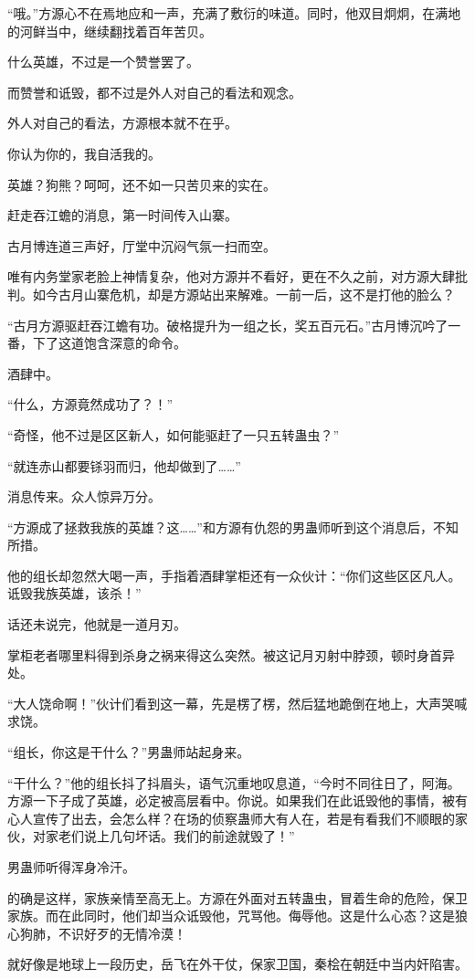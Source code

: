 \begin{this_body}
“哦。”方源心不在焉地应和一声，充满了敷衍的味道。同时，他双目炯炯，在满地的河鲜当中，继续翻找着百年苦贝。

什么英雄，不过是一个赞誉罢了。

而赞誉和诋毁，都不过是外人对自己的看法和观念。

外人对自己的看法，方源根本就不在乎。

你认为你的，我自活我的。

英雄？狗熊？呵呵，还不如一只苦贝来的实在。

赶走吞江蟾的消息，第一时间传入山寨。

古月博连道三声好，厅堂中沉闷气氛一扫而空。

唯有内务堂家老脸上神情复杂，他对方源并不看好，更在不久之前，对方源大肆批判。如今古月山寨危机，却是方源站出来解难。一前一后，这不是打他的脸么？

“古月方源驱赶吞江蟾有功。破格提升为一组之长，奖五百元石。”古月博沉吟了一番，下了这道饱含深意的命令。

酒肆中。

“什么，方源竟然成功了？！”

“奇怪，他不过是区区新人，如何能驱赶了一只五转蛊虫？”

“就连赤山都要铩羽而归，他却做到了……”

消息传来。众人惊异万分。

“方源成了拯救我族的英雄？这……”和方源有仇怨的男蛊师听到这个消息后，不知所措。

他的组长却忽然大喝一声，手指着酒肆掌柜还有一众伙计：“你们这些区区凡人。诋毁我族英雄，该杀！”

话还未说完，他就是一道月刃。

掌柜老者哪里料得到杀身之祸来得这么突然。被这记月刃射中脖颈，顿时身首异处。

“大人饶命啊！”伙计们看到这一幕，先是楞了楞，然后猛地跪倒在地上，大声哭喊求饶。

“组长，你这是干什么？”男蛊师站起身来。

“干什么？”他的组长抖了抖眉头，语气沉重地叹息道，“今时不同往日了，阿海。方源一下子成了英雄，必定被高层看中。你说。如果我们在此诋毁他的事情，被有心人宣传了出去，会怎么样？在场的侦察蛊师大有人在，若是有看我们不顺眼的家伙，对家老们说上几句坏话。我们的前途就毁了！”

男蛊师听得浑身冷汗。

的确是这样，家族亲情至高无上。方源在外面对五转蛊虫，冒着生命的危险，保卫家族。而在此同时，他们却当众诋毁他，咒骂他。侮辱他。这是什么心态？这是狼心狗肺，不识好歹的无情冷漠！

就好像是地球上一段历史，岳飞在外干仗，保家卫国，秦桧在朝廷中当内奸陷害。


\end{this_body}
